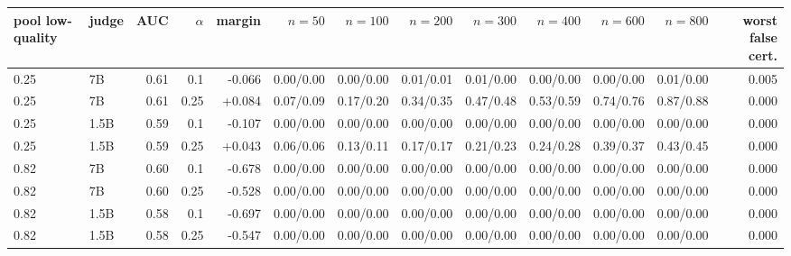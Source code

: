 \begin{tabular}{llrrrrrrrrrrr}
\toprule
pool low-quality & judge & AUC & $\alpha$ & margin & $n{=}50$ & $n{=}100$ & $n{=}200$ & $n{=}300$ & $n{=}400$ & $n{=}600$ & $n{=}800$ & worst false cert. \\
\midrule
0.25 & 7B & 0.61 & 0.1 & -0.066 & 0.00/0.00 & 0.00/0.00 & 0.01/0.01 & 0.01/0.00 & 0.00/0.00 & 0.00/0.00 & 0.01/0.00 & 0.005 \\
0.25 & 7B & 0.61 & 0.25 & +0.084 & 0.07/0.09 & 0.17/0.20 & 0.34/0.35 & 0.47/0.48 & 0.53/0.59 & 0.74/0.76 & 0.87/0.88 & 0.000 \\
0.25 & 1.5B & 0.59 & 0.1 & -0.107 & 0.00/0.00 & 0.00/0.00 & 0.00/0.00 & 0.00/0.00 & 0.00/0.00 & 0.00/0.00 & 0.00/0.00 & 0.000 \\
0.25 & 1.5B & 0.59 & 0.25 & +0.043 & 0.06/0.06 & 0.13/0.11 & 0.17/0.17 & 0.21/0.23 & 0.24/0.28 & 0.39/0.37 & 0.43/0.45 & 0.000 \\
0.82 & 7B & 0.60 & 0.1 & -0.678 & 0.00/0.00 & 0.00/0.00 & 0.00/0.00 & 0.00/0.00 & 0.00/0.00 & 0.00/0.00 & 0.00/0.00 & 0.000 \\
0.82 & 7B & 0.60 & 0.25 & -0.528 & 0.00/0.00 & 0.00/0.00 & 0.00/0.00 & 0.00/0.00 & 0.00/0.00 & 0.00/0.00 & 0.00/0.00 & 0.000 \\
0.82 & 1.5B & 0.58 & 0.1 & -0.697 & 0.00/0.00 & 0.00/0.00 & 0.00/0.00 & 0.00/0.00 & 0.00/0.00 & 0.00/0.00 & 0.00/0.00 & 0.000 \\
0.82 & 1.5B & 0.58 & 0.25 & -0.547 & 0.00/0.00 & 0.00/0.00 & 0.00/0.00 & 0.00/0.00 & 0.00/0.00 & 0.00/0.00 & 0.00/0.00 & 0.000 \\
\bottomrule
\end{tabular}
